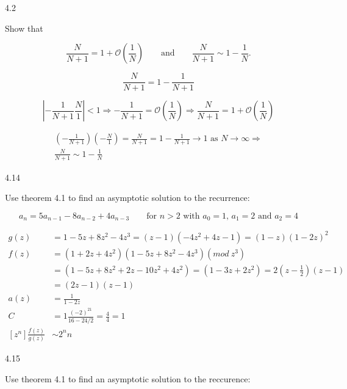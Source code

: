 \documentclass[12pt]{article}
\begin{document}
4.2

Show that

\begin{equation}
\frac{N}{N + 1} = 1 + \mathcal{O}\left(\frac{1}{N}\right) \qquad \text{and}
\qquad \frac{N}{N + 1} \sim 1 - \frac{1}{N}. \nonumber
\end{equation}

\begin{equation}
\frac{N}{N + 1} = 1 - \frac{1}{N + 1} \nonumber
\end{equation}

\begin{equation}
\left|- \frac{1}{N + 1} \frac{N}{1} \right| < 1 \Rightarrow -\frac{1}{N + 1} =
\mathcal{O}\left(\frac{1}{N}\right) \Rightarrow \frac{N}{N + 1} =
1 + \mathcal{O}\left(\frac{1}{N}\right)\nonumber
\end{equation}

\begin{equation}
\begin{split}
\left(-\frac{1}{N + 1}\right)\left(-\frac{N}{1}\right) = \frac{N}{N + 1} =
1 - \frac{1}{N + 1} \rightarrow 1 \text{ as } N \rightarrow \infty \Rightarrow\\
\frac{N}{N + 1} \sim 1 - \frac{1}{N}
\nonumber
\end{split}
\end{equation}

4.14

Use theorem 4.1 to find an asymptotic solution to the recurrence:

\[
a_n = 5a_{n - 1} - 8a_{n - 2} + 4a_{n - 3} \qquad \text{for $n > 2$ with
    $a_0 = 1$, $a_1 = 2$ and $a_2 = 4$} \nonumber
\]

\[
\begin{split}
g(z) & = 1 - 5z + 8z^2 - 4z^3 = (z - 1)(-4z^2 + 4z - 1) = (1 - z)(1 - 2z)^2 \\
f(z) & = (1 + 2z + 4z^2)(1 - 5z + 8z^2 - 4z^3)(mod\ z^3) \\
     & = (1 - 5z + 8z^2 + 2z - 10z^2 + 4z^2) = (1 - 3z + 2z^2)
     = 2(z - \frac{1}{2})(z - 1) \\
     & = (2z - 1)(z - 1) \\
a(z) & = \frac{1}{1 - 2z} \\
C & = 1\frac{(-2)^21}{16 - 24/2} = \frac{4}{4} = 1 \\
[z^n]\frac{f(z)}{g(z)} & \sim 2^nn
\end{split}
\]

4.15

Use theorem 4.1 to find an asymptotic solution to the reccurence:
\end{document}
